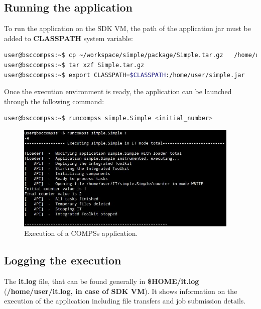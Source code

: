 \subsection{Running the application}
\label{subsec:running_apps}

To run the application on the SDK VM, the path of the application jar must be added to {\bf CLASSPATH} system variable:

\begin{lstlisting}[language=bash]
user@bsccompss:~$ cp ~/workspace/simple/package/Simple.tar.gz   /home/user/
user@bsccompss:~$ tar xzf Simple.tar.gz
user@bsccompss:~$ export CLASSPATH=$CLASSPATH:/home/user/simple.jar
\end{lstlisting}

Once the execution environment is ready, the application can be launched through the following command:

\begin{lstlisting}[language=bash]
user@bsccompss:~$ runcompss simple.Simple <initial_number>
\end{lstlisting}

\begin{figure}[h!]
  \centering
    \includegraphics[width=0.95\textwidth]{./Sections/3_Running_Apps/Figures/compss_execution.jpeg}
    \caption{Execution of a COMPSs application. \label{fig:compss_execution}}
\end{figure}
\vspace{-0.4cm}


\subsection{Logging the execution}
The {\bf it.log} file, that can be found generally in {\bf \$HOME/it.log} ({\bf /home/user/it.log, in case of SDK VM}). It shows information on the execution of the application including file transfers and job submission details.

